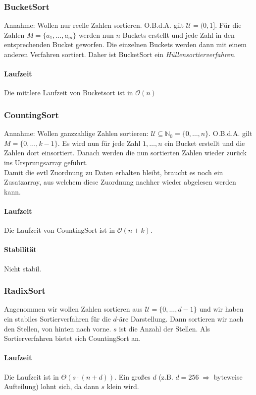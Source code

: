 \documentclass{scrartcl}
\begin{document}
\subsubsection{BucketSort}
Annahme: Wollen nur reelle Zahlen sortieren. O.B.d.A. gilt $\mathcal{U}=(0,1]$.
Für die Zahlen $M=\{a_1,\ldots,a_m\}$ werden nun $n$ Buckets erstellt und jede Zahl in den entsprechenden Bucket geworfen. Die einzelnen Buckets werden dann mit einem anderen Verfahren sortiert. Daher ist BucketSort ein \emph{Hüllensortierverfahren}.
\paragraph{Laufzeit}
Die mittlere Laufzeit von Bucketsort ist in $\mathcal{O}(n)$

\subsubsection{CountingSort}
Annahme: Wollen ganzzahlige Zahlen sortieren: $\mathcal{U}\subseteq\mathds N_0=\{0,\ldots,n\}$. O.B.d.A. gilt $M=\{0,\ldots,k-1\}$. Es wird nun für jede Zahl $1,\ldots,n$ ein Bucket erstellt und die Zahlen dort einsortiert. Danach werden die nun sortierten Zahlen wieder zurück ins Ursprungsarray geführt. \\
Damit die evtl Zuordnung zu Daten erhalten bleibt, braucht es noch ein Zusatzarray, aus welchem diese Zuordnung nachher wieder abgelesen werden kann.
\paragraph{Laufzeit}
Die Laufzeit von CountingSort ist in $\mathcal{O}(n+k)$.
\paragraph{Stabilität}
Nicht stabil.

\subsubsection{RadixSort}
Angenommen wir wollen Zahlen sortieren aus $\mathcal{U}=\{0,\ldots,d-1\}$ und wir haben ein stabiles Sortierverfahren für die $d$-äre Darstellung. Dann sortieren wir nach den Stellen, von hinten nach vorne. $s$ ist die Anzahl der Stellen. {\tiny Als Sortierverfahren bietet sich CountingSort an.}
\paragraph{Laufzeit}
Die Laufzeit ist in $\Theta(s\cdot(n+d))$. {\tiny Ein großes $d$ (z.B. $d=256 \; \Rightarrow$ byteweise Aufteilung) lohnt sich, da dann $s$ klein wird.}
\end{document}
